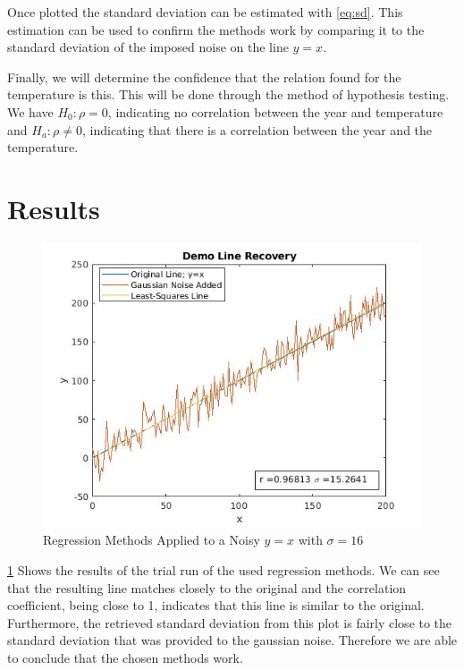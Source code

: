 \documentclass[a4paper, 12pt]{article}
\begin{document}
        Once plotted the standard deviation can be estimated with \cref{eq:sd}. This estimation can be used to confirm the methods work by comparing it to the standard deviation of the imposed noise on the line $y=x$.
        \par
        Finally, we will determine the confidence that the relation found for the temperature is this. This will be done through the method of hypothesis testing. We have $H_0:\rho = 0$, indicating no correlation between the year and temperature and $H_a: \rho \neq 0$, indicating that there is a correlation between the year and the temperature.
    \section{Results}
        \begin{figure}[!ht]
            \centering
            \includegraphics[width=\columnwidth]{demo.jpg}
            \caption{Regression Methods Applied to a Noisy $y=x$ with $\sigma = 16$}
            \label{fig:demo}
        \end{figure}
        \cref{fig:demo} Shows the results of the trial run of the used regression methods. We can see that the resulting line matches closely to the original and the correlation coefficient, being close to 1, indicates that this line is similar to the original. Furthermore, the retrieved standard deviation from this plot is fairly close to the standard deviation that was provided to the gaussian noise. Therefore we are able to conclude that the chosen methods work. 
\end{document}

